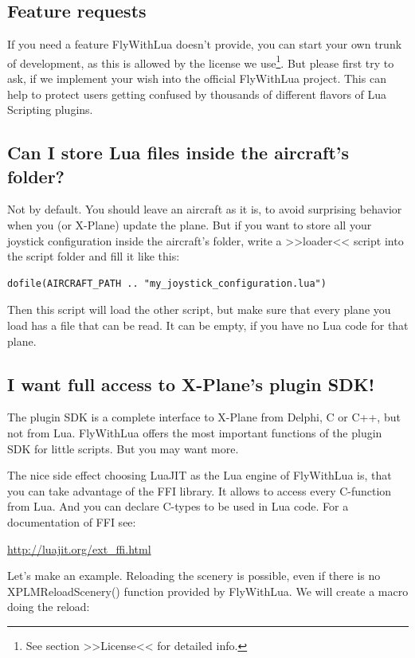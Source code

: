 \documentclass[11pt,parskip=half,a4paper]{scrartcl}
\begin{document}
\subsection{Feature requests}

If you need a feature FlyWithLua doesn't provide, you can start your own trunk of development, as this is allowed by the license we use\footnote{See section >>License<< for detailed info.}. But please first try to ask, if we implement your wish into the official FlyWithLua project. This can help to protect users getting confused by thousands of different flavors of Lua Scripting plugins.

\subsection{Can I store Lua files inside the aircraft's folder?}

Not by default. You should leave an aircraft as it is, to avoid surprising behavior when you (or X-Plane) update the plane. But if you want to store all your joystick configuration inside the aircraft's folder, write a >>loader<< script into the script folder and fill it like this:

\begin{lstlisting}[firstnumber=1]
dofile(AIRCRAFT_PATH .. "my_joystick_configuration.lua")
\end{lstlisting}

Then this script will load the other script, but make sure that every plane you load has a file that can be read. It can be empty, if you have no Lua code for that plane.

\subsection{I want full access to X-Plane's plugin SDK!}

The plugin SDK is a complete interface to X-Plane from Delphi, C or C++, but not from Lua. FlyWithLua offers the most important functions of the plugin SDK for little scripts. But you may want more.

The nice side effect choosing LuaJIT as the Lua engine of FlyWithLua is, that you can take advantage of the FFI library. It allows to access every C-function from Lua. And you can declare C-types to be used in Lua code. For a documentation of FFI see:

\url{http://luajit.org/ext_ffi.html}

Let's make an example. Reloading the scenery is possible, even if there is no XPLMReloadScenery() function provided by FlyWithLua. We will create a macro doing the reload:
\end{document}
